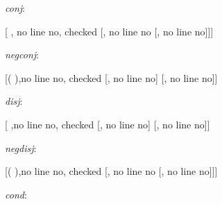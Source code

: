 \begin{figure}[h]
\begin{center}
	\begin{minipage}{0.3\textwidth}
		\begin{center}
			\emph{conj}:

		\begin{tableau}
			{}
			[ \eand {}, no line no, checked
			[, no line no
			[, no line no]]]
		\end{tableau}
		\end{center}
	\end{minipage}
	\begin{minipage}{0.3\textwidth}
	\begin{center}
			\emph{negconj}:

		\begin{tableau}
			{}
			[\enot( \eand {}),no line no, checked
			[\enot{}, no line no]
			[\enot{}, no line no]]
		\end{tableau}
	\end{center}
	\end{minipage}

	\vspace{3mm}

	\begin{minipage}{0.3\textwidth}
		\begin{center}
			\emph{disj}:

		\begin{tableau}
			{}
			[ \eor {},no line no, checked
			[, no line no]
			[, no line no]]
		\end{tableau}
		\end{center}
	\end{minipage}
	\begin{minipage}{0.3\textwidth}
		\begin{center}
			\emph{negdisj}:

		\begin{tableau}
			{}
			[\enot( \eor {}),no line no, checked
			[\enot{}, no line no
			[\enot{}, no line no]]]
		\end{tableau}
		\end{center}
	\end{minipage}

	\vspace{3mm}

	\begin{minipage}{0.3\textwidth}
		\begin{center}
			\emph{cond}:


\end{center}
\end{minipage}
\end{center}
\end{figure}
